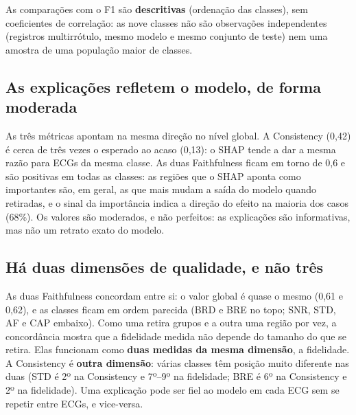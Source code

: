 \documentclass[11pt,a4paper]{article}
\begin{document}
As comparações com o F1 são \textbf{descritivas} (ordenação das classes), sem coeficientes de correlação: as nove classes não são observações independentes (registros multirrótulo, mesmo modelo e mesmo conjunto de teste) nem uma amostra de uma população maior de classes.

\subsection{As explicações refletem o modelo, de forma moderada}
As três métricas apontam na mesma direção no nível global. A Consistency (0,42) é cerca de três vezes o esperado ao acaso (0,13): o SHAP tende a dar a mesma razão para ECGs da mesma classe. As duas Faithfulness ficam em torno de 0,6 e são positivas em todas as classes: as regiões que o SHAP aponta como importantes são, em geral, as que mais mudam a saída do modelo quando retiradas, e o sinal da importância indica a direção do efeito na maioria dos casos (68\%). Os valores são moderados, e não perfeitos: as explicações são informativas, mas não um retrato exato do modelo.

\subsection{Há duas dimensões de qualidade, e não três}
As duas Faithfulness concordam entre si: o valor global é quase o mesmo (0,61 e 0,62), e as classes ficam em ordem parecida (BRD e BRE no topo; SNR, STD, AF e CAP embaixo). Como uma retira grupos e a outra uma região por vez, a concordância mostra que a fidelidade medida não depende do tamanho do que se retira. Elas funcionam como \textbf{duas medidas da mesma dimensão}, a fidelidade. A Consistency é \textbf{outra dimensão}: várias classes têm posição muito diferente nas duas (STD é 2º na Consistency e 7º–9º na fidelidade; BRE é 6º na Consistency e 2º na fidelidade). Uma explicação pode ser fiel ao modelo em cada ECG sem se repetir entre ECGs, e vice-versa.
\end{document}
